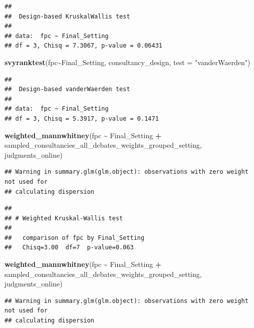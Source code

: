 \documentclass[
]{article}
\newenvironment{Shaded}{\begin{snugshade}}{\end{snugshade}}
\newcommand{\AttributeTok}[1]{\textcolor[rgb]{0.13,0.29,0.53}{#1}}
\newcommand{\FunctionTok}[1]{\textcolor[rgb]{0.13,0.29,0.53}{\textbf{#1}}}
\newcommand{\NormalTok}[1]{#1}
\newcommand{\SpecialCharTok}[1]{\textcolor[rgb]{0.81,0.36,0.00}{\textbf{#1}}}
\newcommand{\StringTok}[1]{\textcolor[rgb]{0.31,0.60,0.02}{#1}}
\begin{document}
\begin{verbatim}
## 
##  Design-based KruskalWallis test
## 
## data:  fpc ~ Final_Setting
## df = 3, Chisq = 7.3067, p-value = 0.06431
\end{verbatim}

\begin{Shaded}
\begin{Highlighting}[]
\FunctionTok{svyranktest}\NormalTok{(fpc}\SpecialCharTok{\textasciitilde{}}\NormalTok{Final\_Setting, consultancy\_design, }\AttributeTok{test =} \StringTok{"vanderWaerden"}\NormalTok{)}
\end{Highlighting}
\end{Shaded}

\begin{verbatim}
## 
##  Design-based vanderWaerden test
## 
## data:  fpc ~ Final_Setting
## df = 3, Chisq = 5.3917, p-value = 0.1471
\end{verbatim}

\begin{Shaded}
\begin{Highlighting}[]
\FunctionTok{weighted\_mannwhitney}\NormalTok{(fpc }\SpecialCharTok{\textasciitilde{}}\NormalTok{ Final\_Setting }\SpecialCharTok{+}\NormalTok{ sampled\_consultancies\_all\_debates\_weights\_grouped\_setting, judgments\_online)}
\end{Highlighting}
\end{Shaded}

\begin{verbatim}
## Warning in summary.glm(glm.object): observations with zero weight not used for
## calculating dispersion
\end{verbatim}

\begin{verbatim}
## 
## # Weighted Kruskal-Wallis test
## 
##   comparison of fpc by Final_Setting
##   Chisq=3.00  df=7  p-value=0.063
\end{verbatim}

\begin{Shaded}
\begin{Highlighting}[]
\FunctionTok{weighted\_mannwhitney}\NormalTok{(fpc }\SpecialCharTok{\textasciitilde{}}\NormalTok{ Final\_Setting }\SpecialCharTok{+}\NormalTok{ sampled\_consultancies\_all\_debates\_weights\_grouped\_setting, judgments\_online)}
\end{Highlighting}
\end{Shaded}

\begin{verbatim}
## Warning in summary.glm(glm.object): observations with zero weight not used for
## calculating dispersion
\end{verbatim}
\end{document}
